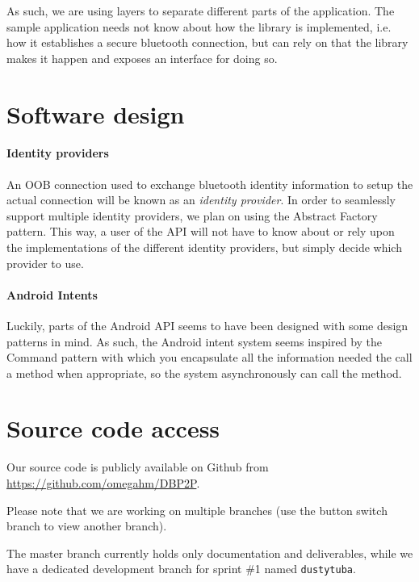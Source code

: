 \documentclass[a4paper,11pt]{article}
\begin{document}
As such, we are using layers to separate different parts of the application.
The sample application needs not know about how the library is implemented, i.e. how it establishes a secure bluetooth connection, but can rely on that the library makes it happen and exposes an interface for doing so.


\section{Software design}
\paragraph{Identity providers}
An OOB connection used to exchange bluetooth identity information to setup the actual connection will be known as an \emph{identity provider}. In order to seamlessly support multiple identity providers, we plan on using the Abstract Factory\cite{GangOfFour} pattern. This way, a user of the API will not have to know about or rely upon the implementations of the different identity providers, but simply decide which provider to use.

\paragraph{Android Intents}
Luckily, parts of the Android API seems to have been designed with some design patterns in mind. As such, the Android intent system seems inspired by the Command\cite{GangOfFour} pattern with which you encapsulate all the information needed the call a method when appropriate, so the system asynchronously can call the method.


\section{Source code access}
Our source code is publicly available on Github from \url{https://github.com/omegahm/DBP2P}.

Please note that we are working on multiple branches (use the button switch branch to view another branch).

The master branch currently holds only documentation and deliverables, while we have a dedicated development branch for sprint \#1 named \texttt{dustytuba}.
\end{document}
